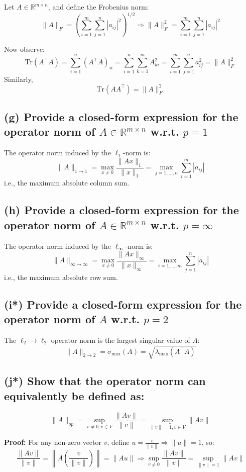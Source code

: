 \documentclass{article}
\begin{document}
Let \( A \in \mathbb{R}^{m \times n} \), and define the Frobenius norm:
\[
\|A\|_F = \left( \sum_{i=1}^m \sum_{j=1}^n |a_{ij}|^2 \right)^{1/2}
\Rightarrow \|A\|_F^2 = \sum_{i=1}^m \sum_{j=1}^n |a_{ij}|^2
\]

Now observe:
\[
\text{Tr}(A^\top A) = \sum_{i=1}^n (A^\top A)_{ii} = \sum_{i=1}^n \sum_{k=1}^m A_{ki}^2 = \sum_{i=1}^m \sum_{j=1}^n a_{ij}^2 = \|A\|_F^2
\]
Similarly,
\[
\text{Tr}(AA^\top) = \|A\|_F^2
\]

\subsection*{(g) Provide a closed-form expression for the operator norm of \( A \in \mathbb{R}^{m \times n} \) w.r.t. \( p = 1 \)}

The operator norm induced by the \( \ell_1 \)-norm is:
\[
\|A\|_{1 \to 1} = \max_{x \neq 0} \frac{\|Ax\|_1}{\|x\|_1} = \max_{j=1,\dots,n} \sum_{i=1}^m |a_{ij}|
\]
i.e., the maximum absolute column sum.

\subsection*{(h) Provide a closed-form expression for the operator norm of \( A \in \mathbb{R}^{m \times n} \) w.r.t. \( p = \infty \)}

The operator norm induced by the \( \ell_\infty \)-norm is:
\[
\|A\|_{\infty \to \infty} = \max_{x \neq 0} \frac{\|Ax\|_\infty}{\|x\|_\infty} = \max_{i=1,\dots,m} \sum_{j=1}^n |a_{ij}|
\]
i.e., the maximum absolute row sum.

\subsection*{(i*) Provide a closed-form expression for the operator norm of \( A \) w.r.t. \( p = 2 \)}

The \( \ell_2 \to \ell_2 \) operator norm is the largest singular value of \( A \):
\[
\|A\|_{2 \to 2} = \sigma_{\max}(A) = \sqrt{\lambda_{\max}(A^\top A)}
\]

\subsection*{(j*) Show that the operator norm can equivalently be defined as:}
\[
\|A\|_{op} = \sup_{v \neq 0, v \in V} \frac{\|Av\|}{\|v\|} = \sup_{\|v\|=1, v \in V} \|Av\|
\]

\textbf{Proof:} For any non-zero vector \( v \), define \( u = \frac{v}{\|v\|} \Rightarrow \|u\| = 1 \), so:
\[
\frac{\|Av\|}{\|v\|} = \left\|A \left(\frac{v}{\|v\|} \right) \right\| = \|Au\|
\Rightarrow \sup_{v \neq 0} \frac{\|Av\|}{\|v\|} = \sup_{\|v\|=1} \|Av\|
\]
\end{document}
